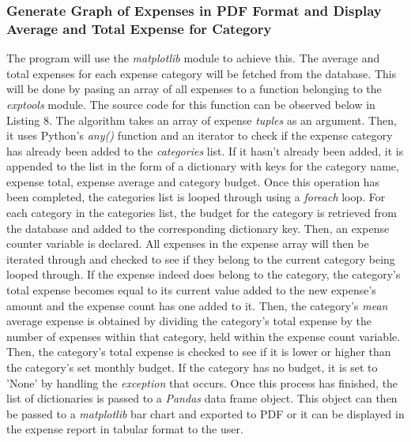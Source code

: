 \documentclass[12pt]{article}
\begin{document}
  \subsubsection{Generate Graph of Expenses in PDF Format and Display Average and Total Expense for Category}
  The program will use the \textit{matplotlib} module to achieve this. The average and total expenses for each expense category will be fetched from the database. This will be done by pasing an array of all expenses to a function belonging to the \textit{exptools} module. The source code for this function can be observed below in Listing 8. The algorithm takes an array of expense \textit{tuples} as an argument. Then, it uses Python's \textit{any()} function and an iterator to check if the expense category has already been added to the \textit{categories} list. If it hasn't already been added, it is appended to the list in the form of a dictionary with keys for the category name, expense total, expense average and category budget. Once this operation has been completed, the categories list is looped through using a \textit{foreach} loop. For each category in the categories list, the budget for the category is retrieved from the database and added to the corresponding dictionary key. Then, an expense counter variable is declared. All expenses in the expense array will then be iterated through and checked to see if they belong to the current category being looped through. If the expense indeed does belong to the category, the category's total expense becomes equal to its current value added to the new expense's amount and the expense count has one added to it. Then, the category's \textit{mean} average expense is obtained by dividing the category's total expense by the number of expenses within that category, held within the expense count variable.
  Then, the category's total expense is checked to see if it is lower or higher than the category's set monthly budget. If the category has no budget, it is set to 'None' by handling the \textit{exception} that occurs.
  Once this process has finished, the list of dictionaries is passed to a \textit{Pandas} data frame object. This object can then be passed to a \textit{matplotlib} bar chart and exported to PDF or it can be displayed in the expense report in tabular format to the user.
\end{document}
